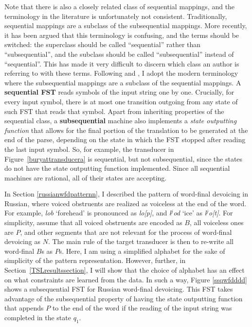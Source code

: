 Note that there is also a closely related class of sequential mappings, and the terminology in the literature is unfortunately not consistent.
Traditionally, sequential mappings are a subclass of the subsequential mappings.
More recently, it has been argued that this terminology is confusing, and the terms should be switched: the superclass should be called ``sequential'' rather than ``subsequential'', and the subclass should be called ``subsequential'' instead of ``sequential''.
This has made it very difficult to discern which class an author is referring to with these terms.
Following \cite{RocheSchabes1997} and \cite{DeLaHiguera2010}, I adopt the modern terminology where the subsequential mappings are a subclass of the sequential mappings.
A \textbf{sequential FST} reads symbols of the input string one by one.
Crucially, for every input symbol, there is at most one transition outgoing from any state of such FST that reads that symbol.
Apart from inheriting properties of the sequential class, a \textbf{subsequential} machine also implements a \emph{state outputting function} that allows for the final portion of the translation to be generated at the end of the parse, depending on the state in which the FST stopped after reading the last input symbol.
So, for example, the transducer in Figure~\ref{buryattransducera} is sequential, but not subsequential, since the states do not have the state outputting function implemented.
Since all sequential machines are rational, all of their states are accepting.


In Section \ref{russianwfdpatternn}, I described the pattern of word-final devoicing in Russian, where voiced obstruents are realized as voiceless at the end of the word.
For example, \emph{lob} `forehead' is pronounced as \emph{lo[p]}, and \emph{l$^j$od} `ice' as \emph{l$^j$o[t]}.
For simplicity, assume that all voiced obstruents are encoded as $B$, all voiceless ones are $P$, and other segments that are not relevant for the process of word-final devoicing as $N$.
The main rule of the target transducer is then to re-write all word-final $B$s as $P$s.
Here, I am using a simplified alphabet for the sake of simplicity of the pattern representation.
However, further, in Section~\ref{TSLresultssection}, I will show that the choice of alphabet has an effect on what constraints are learned from the data.
In such a way, Figure \ref{ssqwfdddd} shows a subsequential FST for Russian word-final devoicing.
This FST takes advantage of the subsequential property of having the state outputting function that appends $P$ to the end of the word if the reading of the input string was completed in the state $q_1$.


